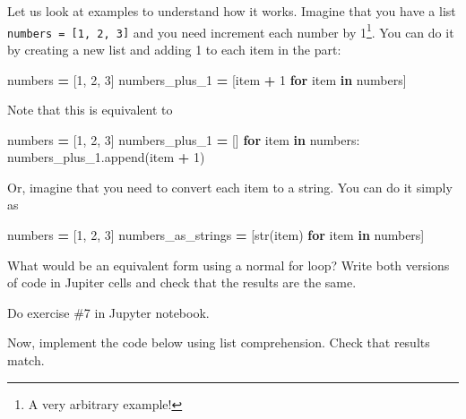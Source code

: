 \documentclass[
]{book}
\newenvironment{Shaded}{\begin{snugshade}}{\end{snugshade}}
\newcommand{\BuiltInTok}[1]{#1}
\newcommand{\ControlFlowTok}[1]{\textcolor[rgb]{0.13,0.29,0.53}{\textbf{#1}}}
\newcommand{\DecValTok}[1]{\textcolor[rgb]{0.00,0.00,0.81}{#1}}
\newcommand{\KeywordTok}[1]{\textcolor[rgb]{0.13,0.29,0.53}{\textbf{#1}}}
\newcommand{\NormalTok}[1]{#1}
\newcommand{\OperatorTok}[1]{\textcolor[rgb]{0.81,0.36,0.00}{\textbf{#1}}}
\begin{document}
Let us look at examples to understand how it works. Imagine that you have a list \texttt{numbers\ =\ {[}1,\ 2,\ 3{]}} and you need increment each number by 1\footnote{A very arbitrary example!}. You can do it by creating a new list and adding 1 to each item in the part:

\begin{Shaded}
\begin{Highlighting}[]
\NormalTok{numbers }\OperatorTok{=}\NormalTok{ [}\DecValTok{1}\NormalTok{, }\DecValTok{2}\NormalTok{, }\DecValTok{3}\NormalTok{]}
\NormalTok{numbers\_plus\_1 }\OperatorTok{=}\NormalTok{ [item }\OperatorTok{+} \DecValTok{1} \ControlFlowTok{for}\NormalTok{ item }\KeywordTok{in}\NormalTok{ numbers]}
\end{Highlighting}
\end{Shaded}

Note that this is equivalent to

\begin{Shaded}
\begin{Highlighting}[]
\NormalTok{numbers }\OperatorTok{=}\NormalTok{ [}\DecValTok{1}\NormalTok{, }\DecValTok{2}\NormalTok{, }\DecValTok{3}\NormalTok{]}
\NormalTok{numbers\_plus\_1 }\OperatorTok{=}\NormalTok{ []}
\ControlFlowTok{for}\NormalTok{ item }\KeywordTok{in}\NormalTok{ numbers:}
\NormalTok{    numbers\_plus\_1.append(item }\OperatorTok{+} \DecValTok{1}\NormalTok{)}
\end{Highlighting}
\end{Shaded}

Or, imagine that you need to convert each item to a string. You can do it simply as

\begin{Shaded}
\begin{Highlighting}[]
\NormalTok{numbers }\OperatorTok{=}\NormalTok{ [}\DecValTok{1}\NormalTok{, }\DecValTok{2}\NormalTok{, }\DecValTok{3}\NormalTok{]}
\NormalTok{numbers\_as\_strings }\OperatorTok{=}\NormalTok{ [}\BuiltInTok{str}\NormalTok{(item) }\ControlFlowTok{for}\NormalTok{ item }\KeywordTok{in}\NormalTok{ numbers]}
\end{Highlighting}
\end{Shaded}

What would be an equivalent form using a normal for loop? Write both versions of code in Jupiter cells and check that the results are the same.

Do exercise \#7 in Jupyter notebook.

Now, implement the code below using list comprehension. Check that results match.
\end{document}

